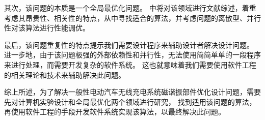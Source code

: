 \documentclass[index]{subfiles}
\begin{document}
其次，该问题的本质是一个全局最优化\cite{zhigljavsky2007}问题。
中将对该领域进行文献综述，着重考虑其昂贵性、相关性的特点，从中寻找适合的算法，并考虑问题的离散型、并行性对该算法进行性能调优。

最后，该问题重复性的特点提示我们需要设计程序来辅助设计者解决设计问题。
进一步地，由于该问题极强的外部依赖性和并行性，无法使用简简单单的一段程序来进行处理，而需要开发复杂的软件系统。
这也就意味着我们需要使用软件工程的相关理论和技术来辅助解决此问题。

综上所述，为了解决一般性电动汽车无线充电系统磁谐振部件优化设计问题，需要先对计算机实验设计和全局最优化两个领域进行研究，
找到适用该问题的算法，再使用软件工程的手段开发软件系统实现该算法，以最终解决此问题。
\end{document}
